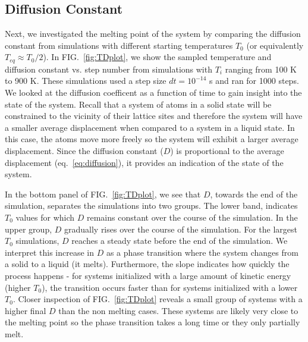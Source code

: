 \documentclass[10pt,showpacs,preprintnumbers,footinbib,amsmath,amssymb,aps,prl,twocolumn,groupedaddress,superscriptaddress,showkeys]{revtex4-1}
\newcommand{\pwrten}[1]{%
	\ensuremath{10^{#1}} }
\begin{document}

\subsection*{Diffusion Constant}

Next, we investigated the melting point of the system by comparing the
diffusion constant from simulations with different starting temperatures
$T_0$ (or equivalently $T_{eq} \approx T_0/2$).
In FIG.~\ref{fig:TDplot}, we show the sampled temperature and
diffusion constant vs. step number from simulations with $T_i$ ranging
from 100 K to 900 K. These simulations used a step size $dt = \pwrten{-14}$
s and ran for 1000 steps. We looked at the diffusion coefficent as a
function of time to gain insight into the state of the system. Recall that
a system of atoms in a solid state will be constrained to the vicinity of
their lattice sites and therefore the system will have a smaller average
displacement when compared to a system in a liquid state. In this case,
the atoms move more freely so the system will exhibit a larger average
displacement. Since the diffusion constant ($D$) is proportional to the
average
displacement (eq.~\ref{eq:diffusion}), it provides an indication of the
state of the system.

In the bottom panel of FIG.~\ref{fig:TDplot},
we see that $D$, towards the end of the simulation, separates the
simulations into two groups.
The lower band, indicates $T_0$ values for which $D$ remains constant
over the course of the simulation. In the upper group, $D$ gradually rises
over the course of the simulation. For the largest $T_0$ simulations,
$D$ reaches a steady state before the end of the simulation. We
interpret this increase in $D$ as a phase transition where the system
changes from a solid to a liquid (it melts). Furthermore, the slope
indicates how quickly the process happens - for systems initialized
with a large amount of kinetic energy (higher $T_0$), the transition
occurs faster than for systems initialized with a lower $T_0$. Closer
inspection of FIG.~\ref{fig:TDplot} reveals a small group of systems
with a higher final $D$ than the non melting cases. These systems
are likely very close to the melting point so the phase transition
takes a long time or they only partially melt.
\end{document}
